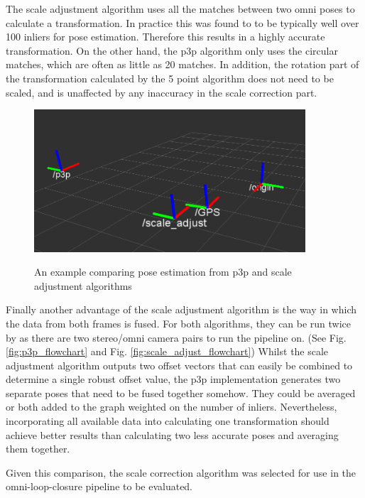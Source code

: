 The scale adjustment algorithm uses all the matches between two omni poses to calculate a transformation.  In practice this was found to to be typically well over 100 inliers for pose estimation.  Therefore this results in a highly accurate transformation.  On the other hand, the p3p algorithm only uses the circular matches, which are often as little as 20 matches.  In addition, the rotation part of the transformation calculated by the 5 point algorithm does not need to be scaled, and is unaffected by any inaccuracy in the scale correction part.

\begin{figure}[h]
  \centering
    \includegraphics[width=0.9\textwidth]{chapters/images/scale_vs_p3p_1}\\
  \caption{An example comparing pose estimation from p3p and scale adjustment algorithms}
  \label{fig:scale_vs_p3p}
\end{figure}


Finally another advantage of the scale adjustment algorithm is the way in which the data from both frames is fused.  For both algorithms, they can be run twice by as there are two stereo/omni camera pairs to run the pipeline on. (See Fig. \ref{fig:p3p_flowchart} and Fig. \ref{fig:scale_adjust_flowchart})   Whilst the scale adjustment algorithm outputs two offset vectors that can easily be combined to determine a single robust offset value, the p3p implementation generates two separate poses that need to be fused together somehow.  They could be averaged or both added to the graph weighted on the number of inliers. Nevertheless, incorporating all available data into calculating one transformation should achieve better results than calculating two less accurate poses and averaging them together.

Given this comparison, the scale correction algorithm was selected for use in the omni-loop-closure pipeline to be evaluated.

